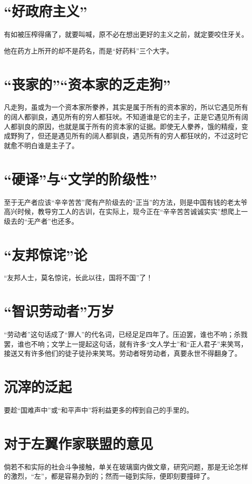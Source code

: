\documentclass[a4paper]{article}
\begin{document}
\begin{sloppy}
        \section{
            “好政府主义”
        }
        有如被压榨得痛了，就要叫喊，原不必在想出更好的主义之前，就定要咬住牙关。

        他在药方上所开的却不是药名，而是“好药料”三个大字。

        \section{
            “丧家的”“资本家的乏走狗”
        }
        凡走狗，虽或为一个资本家所豢养，其实是属于所有的资本家的，所以它遇见所有的阔人都驯良，遇见所有的穷人都狂吠。不知道谁是它的主子，正是它遇见所有阔人都驯良的原因，也就是属于所有的资本家的证据。即使无人豢养，饿的精瘦，变成野狗了，但还是遇见所有的阔人都驯良，遇见所有的穷人都狂吠的，不过这时它就愈不明白谁是主子了。

        \section{
            “硬译”与“文学的阶级性”
        }
        至于无产者应该“辛辛苦苦”爬有产阶级去的“正当”的方法，则是中国有钱的老太爷高兴时候，教导穷工人的古训，在实际上，现今正在“辛辛苦苦诚诚实实”想爬上一级去的“无产者”也还多。

        \section{
            “友邦惊诧”论
        }
        “友邦人士，莫名惊诧，长此以往，国将不国”了！

        \section{
            “智识劳动者”万岁
        }
        “劳动者”这句话成了“罪人”的代名词，已经足足四年了。压迫罢，谁也不响；杀戮罢，谁也不响；文学上一提起这句话，就有许多“文人学士”和“正人君子”来笑骂，接送又有许多他们的徒子徒孙来笑骂。劳动者呀劳动者，真要永世不得翻身了。

        \section{
            沉滓的泛起
        }
        要趁“国难声中”或“和平声中”将利益更多的榨到自己的手里的。

        \section{
            对于左翼作家联盟的意见
        }
        倘若不和实际的社会斗争接触，单关在玻璃窗内做文章，研究问题，那是无论怎样的激烈，“左”，都是容易办到的；然而一碰到实际，便即刻要撞碎了。


\end{sloppy}
\end{document}
